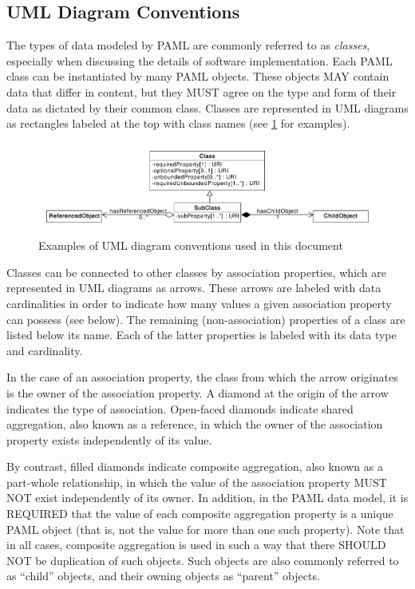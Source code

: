 \subsection{UML Diagram Conventions}
\label{sec:umldiagrams}

The types of data modeled by PAML are commonly referred to as {\em classes}, especially when discussing the details of software implementation. Each PAML class can be instantiated by many PAML objects. These objects MAY contain data that differ in content, but they MUST agree on the type and form of their data as dictated by their common class. Classes are represented in UML diagrams as rectangles labeled at the top with class names (see \ref{fig:uml_sampler} for examples).

\begin{figure}[ht]
\begin{center}
  \includegraphics[width=\textwidth]{figures/uml_sampler.pdf}
\caption{Examples of UML diagram conventions used in this document}
\label{fig:uml_sampler}
\end{center}
\end{figure}

Classes can be connected to other classes by association properties, which are represented in UML diagrams as arrows. These arrows are labeled with data cardinalities in order to indicate how many values a given association property can possess (see below). The remaining (non-association) properties of a class are listed below its name. Each of the latter properties is labeled with its data type and cardinality.

In the case of an association property, the class from which the arrow originates is the owner of the association property. A diamond at the origin of the arrow indicates the type of association.
Open-faced diamonds indicate shared aggregation, also known as a reference, in which the owner of the association property exists independently of its value.

By contrast, filled diamonds indicate composite aggregation, also known as a part-whole relationship, in which the value of the association property MUST NOT exist independently of its owner.
In addition, in the PAML data model, it is REQUIRED that the value of each composite aggregation property is a unique PAML object (that is, not the value for more than one such property).
Note that in all cases, composite aggregation is used in such a way that there SHOULD NOT be duplication of such objects.
Such objects are also commonly referred to as ``child'' objects, and their owning objects as ``parent'' objects.

